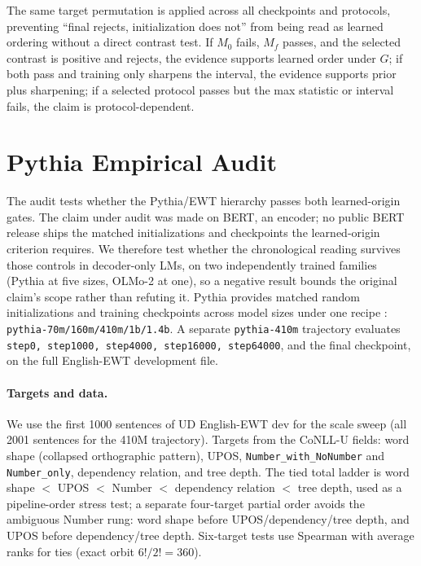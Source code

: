 \documentclass[11pt]{article}
\begin{document}
The same target permutation is applied across all checkpoints and protocols, preventing ``final rejects, initialization does not'' from being read as learned ordering without a direct contrast test. If $M_0$ fails, $M_f$ passes, and the selected contrast is positive and rejects, the evidence supports learned order under $G$; if both pass and training only sharpens the interval, the evidence supports prior plus sharpening; if a selected protocol passes but the max statistic or interval fails, the claim is protocol-dependent.

\section{Pythia Empirical Audit}
\label{sec:empirical}

The audit tests whether the Pythia/EWT hierarchy passes both learned-origin gates. The claim under audit was made on BERT, an encoder; no public BERT release ships the matched initializations and checkpoints the learned-origin criterion requires. We therefore test whether the chronological reading survives those controls in decoder-only LMs, on two independently trained families (Pythia at five sizes, OLMo-2 at one), so a negative result bounds the original claim's scope rather than refuting it. Pythia provides matched random initializations and training checkpoints across model sizes under one recipe \citep{biderman2023pythia}: \texttt{pythia-70m/160m/410m/1b/1.4b}. A separate \texttt{pythia-410m} trajectory evaluates \texttt{step0, step1000, step4000, step16000, step64000}, and the final checkpoint, on the full English-EWT development file.

\paragraph{Targets and data.} We use the first 1000 sentences of UD English-EWT dev \citep{silveira2014gold,nivre2020universal} for the scale sweep (all 2001 sentences for the 410M trajectory). Targets from the CoNLL-U fields: word shape (collapsed orthographic pattern), UPOS, \texttt{Number\_with\_NoNumber} and \texttt{Number\_only}, dependency relation, and tree depth. The tied total ladder is word shape $<$ UPOS $<$ Number $<$ dependency relation $<$ tree depth, used as a pipeline-order stress test; a separate four-target partial order avoids the ambiguous Number rung: word shape before UPOS/dependency/tree depth, and UPOS before dependency/tree depth. Six-target tests use Spearman with average ranks for ties (exact orbit $6!/2!=360$).
\end{document}
